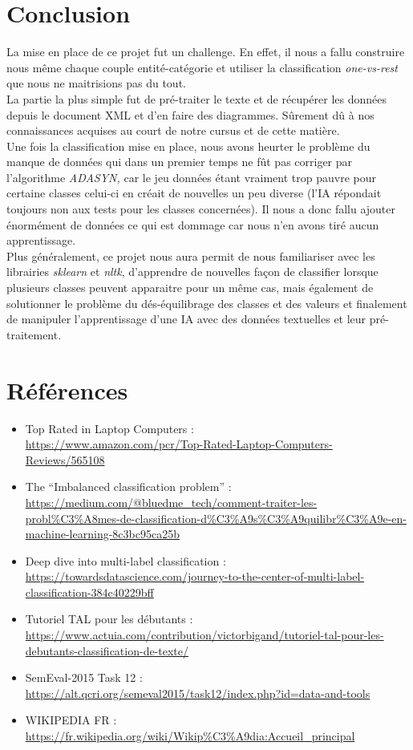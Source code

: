 \documentclass[12pt ,a4paper ]{article}
\begin{document}
\section{Conclusion}
La mise en place de ce projet fut un challenge. En effet, il nous a fallu construire nous même chaque couple entité-catégorie et utiliser la classification \textit{one-vs-rest} que nous ne maitrisions pas du tout.\\
La partie la plus simple fut de pré-traiter le texte et de récupérer les données depuis le document XML et d'en faire des diagrammes. Sûrement dû à nos connaissances acquises au court de notre cursus et de cette matière. \\
Une fois la classification mise en place, nous avons heurter le problème du manque de données qui dans un premier temps ne fût pas corriger par l'algorithme \textit{ADASYN,} car le jeu données étant vraiment trop pauvre pour certaine classes celui-ci en créait de nouvelles un peu diverse (l'IA répondait toujours non aux tests pour les classes concernées). Il nous a donc fallu ajouter énormément de données ce qui est dommage car nous n'en avons tiré aucun apprentissage.\\
Plus généralement, ce projet nous aura permit de nous familiariser avec les librairies \textit{sklearn} et \textit{nltk}, d'apprendre de nouvelles façon de classifier lorsque plusieurs classes peuvent apparaitre pour un même cas, mais également de solutionner le problème du dés-équilibrage des classes et des valeurs et finalement de manipuler l'apprentissage d'une IA avec des données textuelles et leur pré-traitement.

\section{Références}
\begin{itemize}
\item Top Rated in Laptop Computers  :\\ \url{https://www.amazon.com/pcr/Top-Rated-Laptop-Computers-Reviews/565108}%
\item The “Imbalanced classification problem” :\\ \url{https://medium.com/@bluedme_tech/comment-traiter-les-probl%C3%A8mes-de-classification-d%C3%A9s%C3%A9quilibr%C3%A9e-en-machine-learning-8c3bc95ca25b}%
\item Deep dive into multi-label classification :\\ \url{https://towardsdatascience.com/journey-to-the-center-of-multi-label-classification-384c40229bff}%
\item Tutoriel TAL pour les débutants :\\ \url{https://www.actuia.com/contribution/victorbigand/tutoriel-tal-pour-les-debutants-classification-de-texte/}%
\item SemEval-2015 Task 12 :\\ \url{https://alt.qcri.org/semeval2015/task12/index.php?id=data-and-tools}%
\item WIKIPEDIA FR :\\ \url{https://fr.wikipedia.org/wiki/Wikip%C3%A9dia:Accueil_principal}%
\end{itemize}
\end{document}
